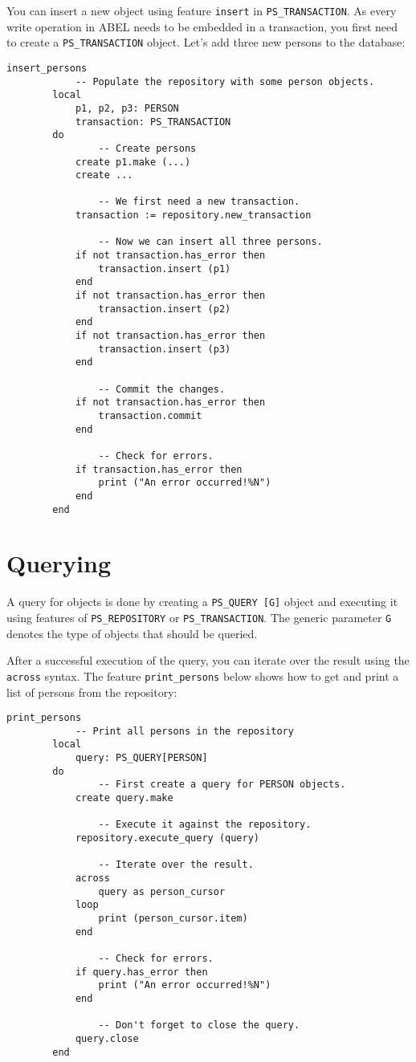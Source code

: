 \documentclass[a4paper,12pt]{report}
\begin{document}
You can insert a new object using feature \lstinline{insert} in \lstinline{PS_TRANSACTION}.
As every write operation in ABEL needs to be embedded in a transaction, you first need to create a \lstinline{PS_TRANSACTION} object.
Let's add three new persons to the database:
\begin{lstlisting}[language=OOSC2Eiffel, captionpos=b, caption={Insertion code.}, label={lst:tutorial_insert}]
	insert_persons
			-- Populate the repository with some person objects.
		local
			p1, p2, p3: PERSON
			transaction: PS_TRANSACTION
		do
				-- Create persons
			create p1.make (...)
			create ...

				-- We first need a new transaction.
			transaction := repository.new_transaction

				-- Now we can insert all three persons.
			if not transaction.has_error then
				transaction.insert (p1)
			end
			if not transaction.has_error then
				transaction.insert (p2)
			end
			if not transaction.has_error then
				transaction.insert (p3)
			end

				-- Commit the changes.
			if not transaction.has_error then
				transaction.commit
			end

				-- Check for errors.
			if transaction.has_error then
				print ("An error occurred!%N")
			end
		end
\end{lstlisting}

\section{Querying}
\label{section:querying}
A query for objects is done by creating a \lstinline!PS_QUERY [G]! object and executing it using features of \lstinline!PS_REPOSITORY! or \lstinline!PS_TRANSACTION!.
The generic parameter \lstinline!G! denotes the type of objects that should be queried.

After a successful execution of the query, you can iterate over the result using the \lstinline!across! syntax. 
The feature \lstinline{print_persons} below shows how to get and print a list of persons from the repository:

\begin{lstlisting}[language=OOSC2Eiffel, captionpos=b, caption={Print all PERSON objects.}, label={lst:simple_query}]
	print_persons
			-- Print all persons in the repository
		local
			query: PS_QUERY[PERSON]
		do
				-- First create a query for PERSON objects.
			create query.make

				-- Execute it against the repository.
			repository.execute_query (query)

				-- Iterate over the result.
			across
				query as person_cursor
			loop
				print (person_cursor.item)
			end
			
				-- Check for errors. 
			if query.has_error then
				print ("An error occurred!%N")
			end

				-- Don't forget to close the query.
			query.close
		end
\end{lstlisting}
\end{document}
